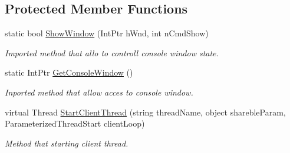 \subsection*{Protected Member Functions}
\begin{DoxyCompactItemize}
\item 
static bool \mbox{\hyperlink{class_uniform_client_1_1_base_client_a47b6d88848854c59fafefeeae3956699}{Show\+Window}} (Int\+Ptr h\+Wnd, int n\+Cmd\+Show)
\begin{DoxyCompactList}\small\item\em Imported method that allo to controll console window state. \end{DoxyCompactList}\item 
static Int\+Ptr \mbox{\hyperlink{class_uniform_client_1_1_base_client_aafcfed25b79baed0db4448f2e30f2aa2}{Get\+Console\+Window}} ()
\begin{DoxyCompactList}\small\item\em Inported method that allow acces to console window. \end{DoxyCompactList}\item 
virtual Thread \mbox{\hyperlink{class_uniform_client_1_1_base_client_a194b46bb0e889d07cade81c0aeab7cea}{Start\+Client\+Thread}} (string thread\+Name, object shareble\+Param, Parameterized\+Thread\+Start client\+Loop)
\begin{DoxyCompactList}\small\item\em Method that starting client thread. \end{DoxyCompactList}\end{DoxyCompactItemize}
